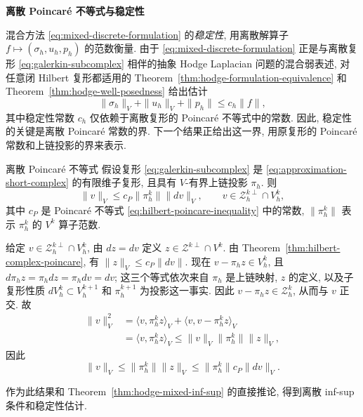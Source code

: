 \medskip\noindent\textbf{{离散 Poincaré 不等式与稳定性}}\par
{混合方法 \eqref{eq:mixed-discrete-formulation} 的\emph{稳定性}, 用离散解算子 $f\mapsto(\sigma_h,u_h,p_h)$ 的范数衡量. 由于 \eqref{eq:mixed-discrete-formulation} 正是与离散复形 \eqref{eq:galerkin-subcomplex} 相伴的抽象 Hodge Laplacian 问题的混合弱表述, 对任意闭 Hilbert 复形都适用的 Theorem~\ref{thm:hodge-formulation-equivalence} 和 Theorem~\ref{thm:hodge-well-posedness} 给出估计}
\begin{equation}\label{eq:discrete-mixed-stability}
\|\sigma_h\|_V+\|u_h\|_V+\|p_h\|\leq c_h\|f\|,
\end{equation}
{其中稳定性常数 $c_h$ 仅依赖于离散复形的 Poincaré 不等式中的常数. 因此, 稳定性的关键是离散 Poincaré 常数的界. 下一个结果正给出这一界, 用原复形的 Poincaré 常数和上链投影的界来表示.}

\begin{Theorem}{{离散 Poincaré 不等式}}\label{thm:discrete-poincare}
{假设复形 \eqref{eq:galerkin-subcomplex} 是 \eqref{eq:approximation-short-complex} 的有限维子复形, 且具有 $V$-有界上链投影 $\pi_h$. 则}
\[
\|v\|_V\leq c_P\|\pi_h^k\|\|dv\|_V,\qquad v\in\mathcal Z_h^{k\perp}\cap V_h^k,
\]
{其中 $c_P$ 是 Poincaré 不等式 \eqref{eq:hilbert-poincare-inequality} 中的常数, $\|\pi_h^k\|$ 表示 $\pi_h^k$ 的 $V^k$ 算子范数.}
\end{Theorem}

\begin{Proof}
{给定 $v\in\mathcal Z_h^{k\perp}\cap V_h^k$, 由 $dz=dv$ 定义 $z\in\mathcal Z^{k\perp}\cap V^k$. 由 Theorem~\ref{thm:hilbert-complex-poincare}, 有 $\|z\|_V\leq c_P\|dv\|$. 现在 $v-\pi_hz\in V_h^k$, 且 $d\pi_hz=\pi_hdz=\pi_hdv=dv$; 这三个等式依次来自 $\pi_h$ 是上链映射, $z$ 的定义, 以及子复形性质 $dV_h^k\subset V_h^{k+1}$ 和 $\pi_h^{k+1}$ 为投影这一事实. 因此 $v-\pi_hz\in\mathcal Z_h^k$, 从而与 $v$ 正交. 故}
\[
\begin{aligned}
\|v\|_V^2&=\langle v,\pi_h^kz\rangle_V+\langle v,v-\pi_h^kz\rangle_V\\
&=\langle v,\pi_h^kz\rangle_V\leq\|v\|_V\|\pi_h^k\|\|z\|_V,
\end{aligned}
\]
{因此}
\[
\|v\|_V\leq\|\pi_h^k\|\|z\|_V\leq\|\pi_h^k\|c_P\|dv\|_V.
\]
\end{Proof}

{作为此结果和 Theorem~\ref{thm:hodge-mixed-inf-sup} 的直接推论, 得到离散 inf-sup 条件和稳定性估计.}

